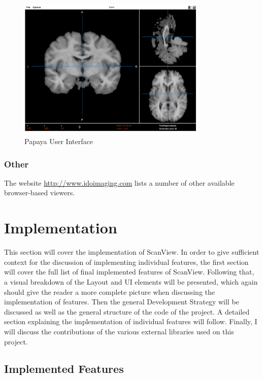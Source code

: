 \documentclass[a4paper,11pt,twoside]{article}
\begin{document}
\begin{figure}[ht!]
\centering
\includegraphics[width=90mm]{..//literatureSurvey/graphics/webViewer_02.png}
\caption{Papaya User Interface}
\label{fig:UIdesign1}
\end{figure}



\subsubsection{Other}

The website \url{http://www.idoimaging.com} lists a number of other available browser-based viewers.




\newpage


\section{Implementation}

This section will cover the implementation of ScanView. In order to give sufficient context for the discussion of implementing individual features, the first section will cover the full list of final implemented features of ScanView. Following that, a visual breakdown of the Layout and UI elements will be presented, which again should give the reader a more complete picture when discussing the implementation of features. Then the general Development Strategy will be discussed as well as the general structure of the code of the project. A detailed section explaining the implementation of individual features will follow. Finally, I will discuss the contributions of the various external libraries used on this project.

\subsection{Implemented Features}
\end{document}
